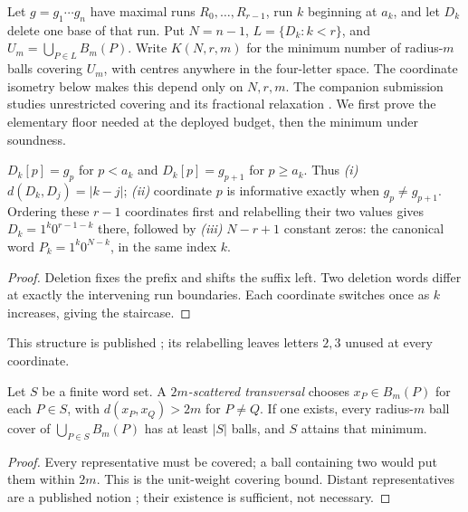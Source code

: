 \label{sec:method}
\label{sec:construction}

Let $g=g_1\cdots g_n$ have maximal runs $R_0,\ldots,R_{r-1}$, run $k$ beginning at
$a_k$, and let $D_k$ delete one base of that run. Put $N=n-1$, $L=\{D_k:k<r\}$,
and $U_m=\bigcup_{P\in L}B_m(P)$. Write $K(N,r,m)$ for the minimum number of radius-$m$
balls covering $U_m$, with centres anywhere in the four-letter space. The coordinate isometry
below makes this depend only on $N,r,m$. The companion submission studies unrestricted covering and its fractional relaxation
\citep{companion_reach}. We first prove the elementary floor
needed at the deployed budget, then the minimum under soundness.

\begin{proposition}\label{prop:structure}
$D_k[p]=g_p$ for $p<a_k$ and $D_k[p]=g_{p+1}$ for $p\ge a_k$.
Thus \emph{(i)} $d(D_k,D_j)=|k-j|$; \emph{(ii)} coordinate $p$ is informative exactly when
$g_p\ne g_{p+1}$. Ordering these $r-1$ coordinates first and relabelling their
two values gives $D_k=1^k0^{r-1-k}$ there, followed by \emph{(iii)} $N-r+1$ constant zeros:
the canonical word $P_k=1^k0^{N-k}$, in the same index $k$.
\end{proposition}
\begin{proof}
Deletion fixes the prefix and shifts the suffix left. Two deletion words differ
at exactly the intervening run boundaries. Each coordinate switches once as
$k$ increases, giving the staircase.
\end{proof}
This structure is published \citep{abusini2021reconstruction,abbasian2024errorball};
its relabelling leaves letters $2,3$ unused at every coordinate.

\begin{theorem}\label{thm:floor}
Let $S$ be a finite word set. A \emph{$2m$-scattered transversal} chooses
$x_P\in B_m(P)$ for each $P\in S$, with $d(x_P,x_Q)>2m$ for $P\ne Q$.
If one exists, every radius-$m$ ball cover of $\bigcup_{P\in S}B_m(P)$
has at least $|S|$ balls, and $S$ attains that minimum.
\end{theorem}
\begin{proof}
Every representative must be covered; a ball containing two would put them within
$2m$. This is the unit-weight covering bound. Distant representatives are a published
notion \citep{fiala2005distant}; their existence is sufficient, not necessary.
\end{proof}

